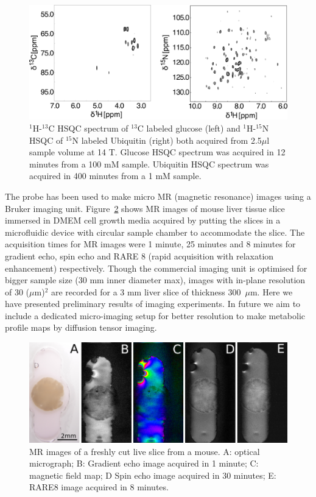 \documentclass[preprint,12pt]{article}
\begin{document}
\begin{figure}
\centering
\includegraphics[width=.7\linewidth,keepaspectratio=true]{./figures/ms5n17-tlp-sp-180612-HSQCspect.png} 
\caption{$^1$H-$^{13}$C HSQC spectrum of $^{13}$C labeled glucose (left) and $^1$H-$^{15}$N HSQC of $^{15}$N labeled Ubiquitin (right) both acquired from 2.5$\mu$l sample volume at 14 T. Glucose HSQC spectrum was acquired in 12 minutes from a 100 mM sample. Ubiquitin HSQC spectrum was acquired in 400 minutes from a 1 mM sample.}
\label{fig:HSQC} 
\end{figure}
The probe has been used to make micro MR (magnetic resonance) images using a Bruker imaging unit. Figure~\ref{fig:tisli} shows MR images of mouse liver tissue slice immersed in DMEM cell growth media acquired by putting the slices in a microfluidic device with circular sample chamber to accommodate the slice. The acquisition times for MR images were 1 minute, 25 minutes and 8 minutes for gradient echo, spin echo and RARE 8 (rapid acquisition with relaxation enhancement) respectively. Though the commercial imaging unit is optimised for bigger sample size (30 mm inner diameter max), images with in-plane resolution of 30 ($\mu$m)$^{2}$ are recorded for a 3 mm liver slice of thickness 300~$\mu$m. Here we have presented preliminary results of imaging experiments. In future we aim to include a dedicated micro-imaging setup for better resolution to make metabolic profile maps by diffusion tensor imaging.
\begin{figure}
\centering
\includegraphics[width=.7\linewidth,keepaspectratio=true]{./figures/ms5n17-tisli-im-180511.png} 
\caption{MR images of a freshly cut live slice from a mouse. A: optical micrograph; B: Gradient echo image acquired in 1 minute; C: magnetic field map; D Spin echo image acquired in 30 minutes; E: RARE8 image acquired in 8 minutes.}
\label{fig:tisli} 
\end{figure}
\end{document}
